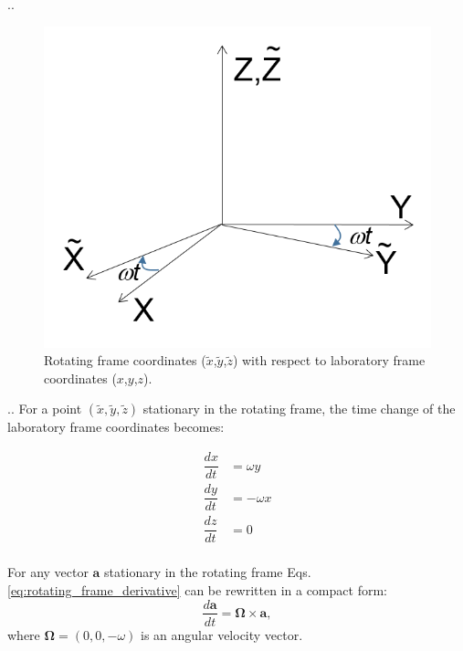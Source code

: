 \documentclass{beamer}
\begin{document}
\begin{frame}[shrink=5]{\thesection.\thesubsection. \insertsubsection}
  \begin{figure}[ht] 
  	\caption{Rotating frame coordinates ($\tilde{x}$,$\tilde{y}$,$\tilde{z}$) with respect to laboratory frame coordinates ($x$,$y$,$z$). }
  	\label{fig:rot_frame}
  	\centering
  	\includegraphics[scale=0.3]{rotating_frame.png}
  \end{figure}
\end{frame}
\begin{frame}{\thesection.\thesubsection. \insertsubsection}For a point $(\tilde{x},\tilde{y},\tilde{z})$ stationary in the rotating frame, the time change of the laboratory frame coordinates becomes:
 
 \begin{equation} \label{eq:rotating_frame_derivative}
 \begin{array}{lcl}
 \dfrac{dx}{dt} &= \omega {y}  \\
 \dfrac{dy}{dt} &= -\omega {x}  \\
 \dfrac{dz}{dt} &= 0  \\
 \end{array}
 \end{equation} 
 
 For any vector $\bm{a}$ stationary in the rotating frame Eqs.\ref{eq:rotating_frame_derivative} can be rewritten in a compact form:
 \begin{equation}
 \dfrac{d\bm{a}}{dt} = \bm{\Omega} \times \bm{a},
 \end{equation}
 where $\bm{\Omega} = (0,0, -\omega)$ is an angular velocity vector.


\end{frame}
\end{document}
